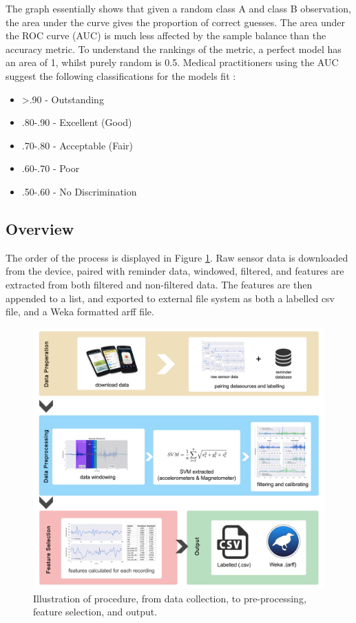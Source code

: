 The graph essentially shows that given a random class A and class B observation, the area under the curve gives the proportion of correct guesses. The area under the ROC curve (AUC) is much less affected by the sample balance than the accuracy metric. To understand the rankings of the metric, a perfect model has an area of 1, whilst purely random is 0.5.
Medical practitioners using the AUC suggest the following classifications for the models fit \cite{Tape}:
\begin{itemize}[noitemsep,topsep=0pt]
  \item \textgreater .90 - Outstanding
  \item .80-.90 - Excellent (Good)
  \item .70-.80 - Acceptable (Fair)
  \item .60-.70 - Poor
  \item .50-.60 - No Discrimination
\end{itemize}

\subsection{Overview}
The order of the process is displayed in Figure \ref{fig: process-overview}. Raw sensor data is downloaded from the device, paired with reminder data, windowed, filtered, and features are extracted from both filtered and non-filtered data. The features are then appended to a list, and exported to external file system as both a labelled csv file, and a Weka formatted arff file.

\begin{figure}[h]
    \centering
        \includegraphics[scale=0.2, angle=0]{Files/treatment-study-1/figures/process-outlined}
        \caption{Illustration of procedure, from data collection, to pre-processing, feature selection, and output.}
        \label{fig: process-overview}
\end{figure}

